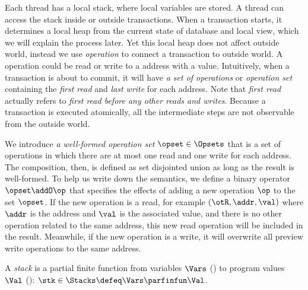 Each thread has a local stack, where local variables are stored.
A thread can access the stack inside or outside transactions.
When a transaction starts, it determines a local heap from the current state of database and local view, which we will explain the process later.
Yet this local heap does not affect outside world, instead we use \emph{operation} to connect a transaction to outside world.
A operation could be read or write to a address with a value.
Intuitively, when a transaction is about to commit, it will have \emph{a set of operations} or \emph{operation set} containing the \emph{first read} and \emph{last write} for each address.
Note that \emph{first read} actually refers to \emph{first read before any other reads and writes}.
Because a transaction is executed atomically, all the intermediate steps are not observable from the outside world.

We introduce \emph{a well-formed operation set} \( \opset \in \Opsets\) that is a set of operations in which there are at most one read and one write for each address.
The composition, then, is defined as set disjointed union as long as the result is well-formed.
To help us write down the semantics, we define a binary operator \( \opset \addO \op \) that specifies the effects of adding a new operation \( \op \) to the set \( \opset \).
If the new operation is a read, for example \((\otR, \addr, \val)\) where \( \addr \) is the address and \( \val\) is the associated value, and there is no other operation related to the same address, this new read operation will be included in the result.
Meanwhile, if the new operation is a write, it will overwrite all preview write operations to the same address.


\begin{defn}[Stacks]
\label{def:stacks}
A \emph{stack} is a partial finite function from variables \( \Vars \) () to program values \( \Val \) (): \( \stk \in \Stacks \defeq \Vars \parfinfun \Val \).
\end{defn}


